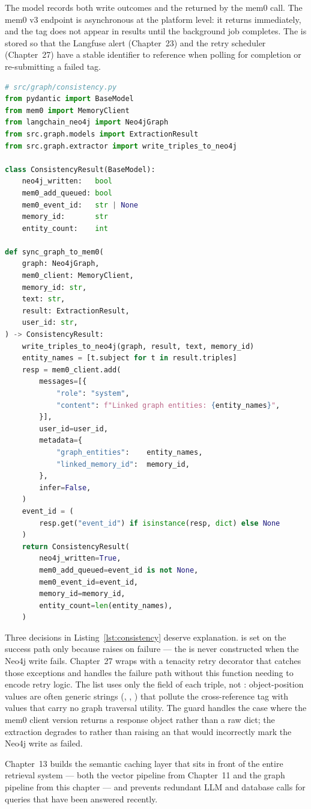 The  model records both write outcomes and the
 returned by the mem0  call. The mem0 v3
 endpoint is asynchronous at the platform level: it returns
 immediately, and the
tag does not appear in  results until the background
job completes. The  is stored so that the Langfuse alert
(Chapter~23) and the retry scheduler (Chapter~27) have a stable identifier
to reference when polling for completion or re-submitting a failed tag.

\begin{lstlisting}[language=Python,
  caption={ConsistencyResult model and sync\_graph\_to\_mem0()},
  label={lst:consistency}]
# src/graph/consistency.py
from pydantic import BaseModel
from mem0 import MemoryClient
from langchain_neo4j import Neo4jGraph
from src.graph.models import ExtractionResult
from src.graph.extractor import write_triples_to_neo4j

class ConsistencyResult(BaseModel):
    neo4j_written:   bool
    mem0_add_queued: bool
    mem0_event_id:   str | None
    memory_id:       str
    entity_count:    int

def sync_graph_to_mem0(
    graph: Neo4jGraph,
    mem0_client: MemoryClient,
    memory_id: str,
    text: str,
    result: ExtractionResult,
    user_id: str,
) -> ConsistencyResult:
    write_triples_to_neo4j(graph, result, text, memory_id)
    entity_names = [t.subject for t in result.triples]
    resp = mem0_client.add(
        messages=[{
            "role": "system",
            "content": f"Linked graph entities: {entity_names}",
        }],
        user_id=user_id,
        metadata={
            "graph_entities":    entity_names,
            "linked_memory_id":  memory_id,
        },
        infer=False,
    )
    event_id = (
        resp.get("event_id") if isinstance(resp, dict) else None
    )
    return ConsistencyResult(
        neo4j_written=True,
        mem0_add_queued=event_id is not None,
        mem0_event_id=event_id,
        memory_id=memory_id,
        entity_count=len(entity_names),
    )
\end{lstlisting}

Three decisions in Listing~\ref{lst:consistency} deserve explanation.
 is set on the success path only because
 raises on failure --- the
 is never constructed when the Neo4j write fails.
Chapter~27 wraps  with a tenacity retry
decorator that catches those exceptions and handles the failure path
without this function needing to encode retry logic. The
 list uses only the  field of each
triple, not : object-position values are often generic
strings (, , ) that pollute
the cross-reference tag with values that carry no graph traversal utility.
The  guard handles the case where the mem0
client version returns a response object rather than a raw dict; the
 extraction degrades to  rather than raising an
 that would incorrectly mark the Neo4j write as
failed.

Chapter~13 builds the semantic caching layer that sits in front of the
entire retrieval system --- both the vector pipeline from Chapter~11 and
the graph pipeline from this chapter --- and prevents redundant LLM and
database calls for queries that have been answered recently.
